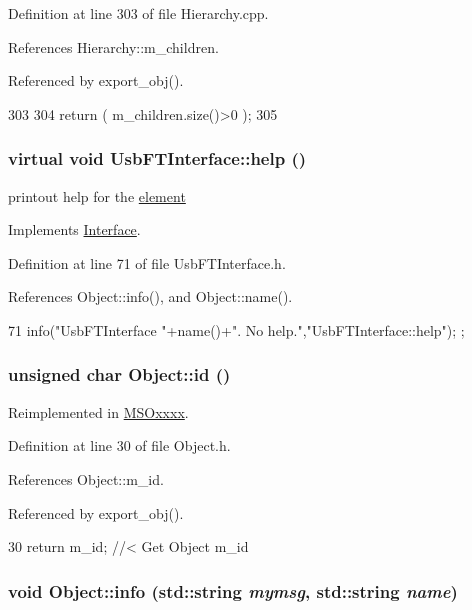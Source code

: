 Definition at line 303 of file Hierarchy.cpp.

References Hierarchy::m\_\-children.

Referenced by export\_\-obj().


\begin{DoxyCode}
303                               {
304   return ( m_children.size()>0 );
305 }
\end{DoxyCode}
\hypertarget{classUsbFTInterface_a91a0046390c76ca8abaa330fa244279c}{
\subsubsection[{help}]{\setlength{\rightskip}{0pt plus 5cm}virtual void UsbFTInterface::help ()}}
\label{classUsbFTInterface_a91a0046390c76ca8abaa330fa244279c}
printout help for the \hyperlink{namespaceelement}{element} 

Implements \hyperlink{classInterface_aedd3cf1d964c837e7848ccf81dc9c760}{Interface}.

Definition at line 71 of file UsbFTInterface.h.

References Object::info(), and Object::name().


\begin{DoxyCode}
71 { info("UsbFTInterface "+name()+". No help.","UsbFTInterface::help"); };
\end{DoxyCode}
\hypertarget{classObject_af99145335cc61ff6e2798ea17db009d2}{
\subsubsection[{id}]{\setlength{\rightskip}{0pt plus 5cm}unsigned char Object::id ()}}
\label{classObject_af99145335cc61ff6e2798ea17db009d2}


Reimplemented in \hyperlink{classMSOxxxx_a0f14b23d31d8e7647184e99a89600cc3}{MSOxxxx}.

Definition at line 30 of file Object.h.

References Object::m\_\-id.

Referenced by export\_\-obj().


\begin{DoxyCode}
30 { return m_id;         } //< Get Object m_id 
\end{DoxyCode}
\hypertarget{classObject_a1ca123253dfd30fc28b156f521dcbdae}{
\subsubsection[{info}]{\setlength{\rightskip}{0pt plus 5cm}void Object::info (std::string {\em mymsg}, \/  std::string {\em name})}}
\label{classObject_a1ca123253dfd30fc28b156f521dcbdae}


